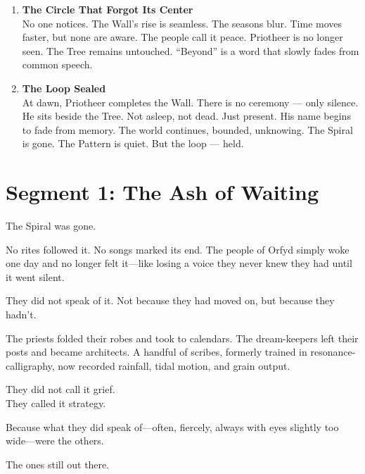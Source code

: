 \documentclass[9pt]{article}
\begin{document}
\begin{enumerate}
    \vspace{1em}
    \item \textbf{The Circle That Forgot Its Center} \\
    No one notices. The Wall’s rise is seamless. The seasons blur. Time moves faster, but none are aware. The people call it peace. Priotheer is no longer seen. The Tree remains untouched. “Beyond” is a word that slowly fades from common speech.

    \vspace{1em}
    \item \textbf{The Loop Sealed} \\
    At dawn, Priotheer completes the Wall. There is no ceremony — only silence. He sits beside the Tree. Not asleep, not dead. Just present. His name begins to fade from memory. The world continues, bounded, unknowing. The Spiral is gone. The Pattern is quiet. But the loop — held.
\end{enumerate}


\newpage

\section*{Segment 1: The Ash of Waiting}

The Spiral was gone.

\vspace{0.5em}
No rites followed it. No songs marked its end. The people of Orfyd simply woke one day and no longer felt it---like losing a voice they never knew they had until it went silent.

\vspace{0.5em}
They did not speak of it. Not because they had moved on, but because they hadn't.

\vspace{0.5em}
The priests folded their robes and took to calendars. The dream-keepers left their posts and became architects. A handful of scribes, formerly trained in resonance-calligraphy, now recorded rainfall, tidal motion, and grain output.

\vspace{0.5em}
They did not call it grief.\\
They called it strategy.

\vspace{0.5em}
Because what they did speak of---often, fiercely, always with eyes slightly too wide---were the others.

\vspace{0.5em}
The ones still out there.
\end{document}
